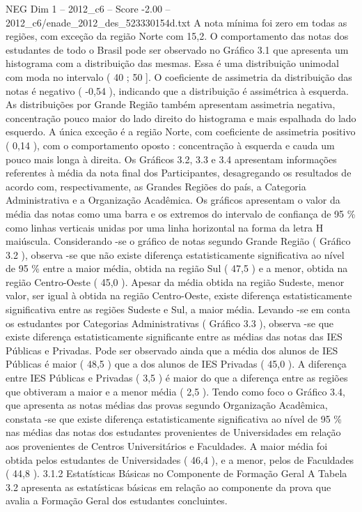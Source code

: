 \begin{textsample}{NEG Dim 1 – 2012\_c6 – Score -2.00 – 2012\_c6/enade\_2012\_des\_523330154d.txt}
A nota mínima foi zero em todas as regiões, com exceção da região Norte com 15,2.
O comportamento das notas dos estudantes de todo o Brasil pode ser observado no Gráfico 3.1 que apresenta um histograma com a distribuição das mesmas.
Essa é uma distribuição unimodal com moda no intervalo ( 40 ; 50 ].
O coeficiente de assimetria da distribuição das notas é negativo ( -0,54 ), indicando que a distribuição é assimétrica à esquerda.
As distribuições por Grande Região também apresentam assimetria negativa, concentração pouco maior do lado direito do histograma e mais espalhada do lado esquerdo.
A única exceção é a região Norte, com coeficiente de assimetria positivo ( 0,14 ), com o comportamento oposto : concentração à esquerda e cauda um pouco mais longa à direita.
Os Gráficos 3.2, 3.3 e 3.4 apresentam informações referentes à média da nota final dos Participantes, desagregando os resultados de acordo com, respectivamente, as Grandes Regiões do país, a Categoria Administrativa e a Organização Acadêmica.
Os gráficos apresentam o valor da média das notas como uma barra e os extremos do intervalo de confiança de 95 \% como linhas verticais unidas por uma linha horizontal na forma da letra H maiúscula.
Considerando -se o gráfico de notas segundo Grande Região ( Gráfico 3.2 ), observa -se que não existe diferença estatisticamente significativa ao nível de 95 \% entre a maior média, obtida na região Sul ( 47,5 ) e a menor, obtida na região Centro-Oeste ( 45,0 ).
Apesar da média obtida na região Sudeste, menor valor, ser igual à obtida na região Centro-Oeste, existe diferença estatisticamente significativa entre as regiões Sudeste e Sul, a maior média.
Levando -se em conta os estudantes por Categorias Administrativas ( Gráfico 3.3 ), observa -se que existe diferença estatisticamente significante entre as médias das notas das IES Públicas e Privadas.
Pode ser observado ainda que a média dos alunos de IES Públicas é maior ( 48,5 ) que a dos alunos de IES Privadas ( 45,0 ).
A diferença entre IES Públicas e Privadas ( 3,5 ) é maior do que a diferença entre as regiões que obtiveram a maior e a menor média ( 2,5 ).
Tendo como foco o Gráfico 3.4, que apresenta as notas médias das provas segundo Organização Acadêmica, constata -se que existe diferença estatisticamente significativa ao nível de 95 \% nas médias das notas dos estudantes provenientes de Universidades em relação aos provenientes de Centros Universitários e Faculdades.
A maior média foi obtida pelos estudantes de Universidades ( 46,4 ), e a menor, pelos de Faculdades ( 44,8 ). 3.1.2 Estatísticas Básicas no Componente de Formação Geral A Tabela 3.2 apresenta as estatísticas básicas em relação ao componente da prova que avalia a Formação Geral dos estudantes concluintes.

\end{textsample}
